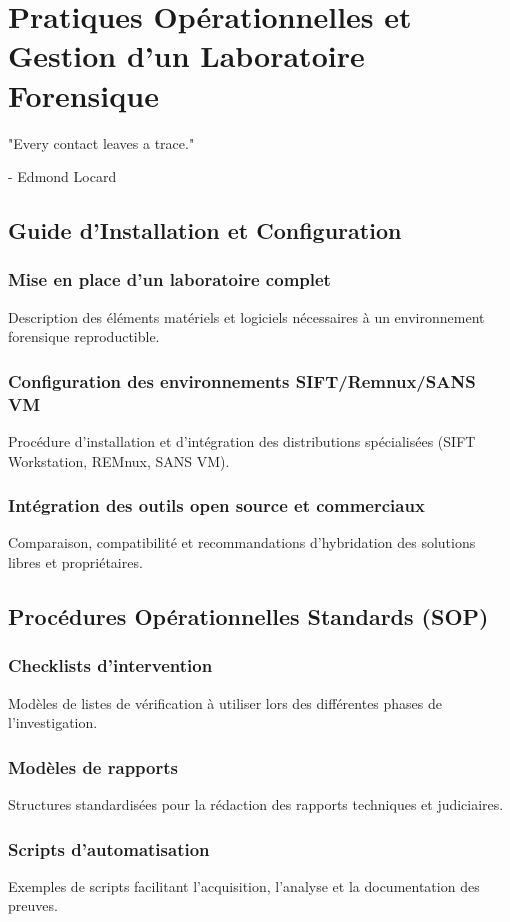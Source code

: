 \chapter{Pratiques Opérationnelles et Gestion d'un Laboratoire Forensique}\label{chap:lab_forensics}
\epigraph{"Every contact leaves a trace."}{- Edmond Locard}
\section{Guide d'Installation et Configuration}\label{sec:setup}
\subsection{Mise en place d’un laboratoire complet}
Description des éléments matériels et logiciels nécessaires à un environnement forensique reproductible.

\subsection{Configuration des environnements SIFT/Remnux/SANS VM}
Procédure d’installation et d’intégration des distributions spécialisées (SIFT Workstation, REMnux, SANS VM).

\subsection{Intégration des outils open source et commerciaux}
Comparaison, compatibilité et recommandations d’hybridation des solutions libres et propriétaires.

\section{Procédures Opérationnelles Standards (SOP)}\label{sec:sop}
\subsection{Checklists d’intervention}
Modèles de listes de vérification à utiliser lors des différentes phases de l’investigation.

\subsection{Modèles de rapports}
Structures standardisées pour la rédaction des rapports techniques et judiciaires.

\subsection{Scripts d’automatisation}
Exemples de scripts facilitant l’acquisition, l’analyse et la documentation des preuves.

